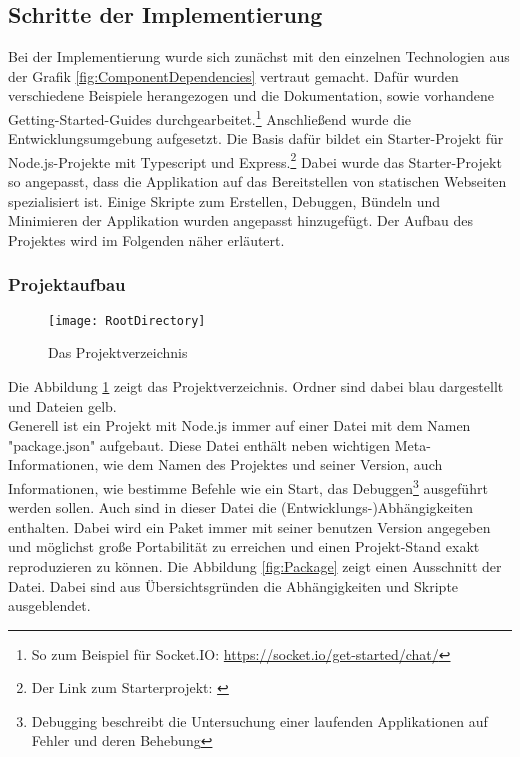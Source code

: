 \subsection{Schritte der Implementierung}
\label{subsec:Implementierung}

Bei der Implementierung wurde sich zunächst mit den einzelnen Technologien aus der Grafik \ref{fig:ComponentDependencies} vertraut gemacht. Dafür wurden verschiedene Beispiele herangezogen und die Dokumentation, sowie \ggf vorhandene Getting-Started-Guides durchgearbeitet.\footnote{So zum Beispiel für Socket.IO: \url{https://socket.io/get-started/chat/}}
Anschließend wurde die Entwicklungsumgebung aufgesetzt. Die Basis dafür bildet ein Starter-Projekt für Node.js-Projekte mit Typescript und Express.\footnote{Der Link zum Starterprojekt: \cite{typescript_node_starter}} Dabei wurde das Starter-Projekt so angepasst, dass die Applikation auf das Bereitstellen von statischen Webseiten spezialisiert ist. Einige Skripte zum Erstellen, Debuggen, Bündeln und Minimieren der Applikation wurden angepasst \bzw hinzugefügt. Der Aufbau des Projektes wird im Folgenden näher erläutert.

\subsubsection{Projektaufbau}

\begin{figure}[htp]
	\centering
	\captionsetup{justification=centering}
	\texttt{[image: RootDirectory]}
	\caption[Projektverzeichnis]{Das Projektverzeichnis}
	\label{fig:RootDirectory}
\end{figure}

\noindent Die Abbildung \ref{fig:RootDirectory} zeigt das Projektverzeichnis. Ordner sind dabei blau dargestellt und Dateien gelb.\\
Generell ist ein Projekt mit Node.js immer auf einer Datei mit dem Namen "package.json" aufgebaut. Diese Datei enthält neben wichtigen Meta-Informationen, wie dem Namen des Projektes und seiner Version, auch Informationen, wie bestimme Befehle wie ein Start, das Debuggen\footnote{Debugging beschreibt die Untersuchung einer laufenden Applikationen auf Fehler und deren Behebung} \etc ausgeführt werden sollen. Auch sind in dieser Datei die (Entwicklungs-)Abhängigkeiten enthalten. Dabei wird ein Paket immer mit seiner benutzen Version angegeben und möglichst große Portabilität zu erreichen und einen Projekt-Stand exakt reproduzieren zu können. Die Abbildung \ref{fig:Package} zeigt einen Ausschnitt der Datei. Dabei sind aus Übersichtsgründen die Abhängigkeiten und Skripte ausgeblendet.

